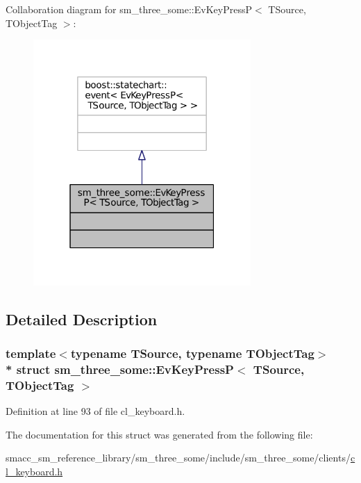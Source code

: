 Collaboration diagram for sm\+\_\+three\+\_\+some\+:\+:Ev\+Key\+PressP$<$ T\+Source, T\+Object\+Tag $>$\+:
\nopagebreak
\begin{figure}[H]
\begin{center}
\leavevmode
\includegraphics[width=235pt]{structsm__three__some_1_1EvKeyPressP__coll__graph}
\end{center}
\end{figure}


\subsection{Detailed Description}
\subsubsection*{template$<$typename T\+Source, typename T\+Object\+Tag$>$\\*
struct sm\+\_\+three\+\_\+some\+::\+Ev\+Key\+Press\+P$<$ T\+Source, T\+Object\+Tag $>$}



Definition at line 93 of file cl\+\_\+keyboard.\+h.



The documentation for this struct was generated from the following file\+:\begin{DoxyCompactItemize}
\item 
smacc\+\_\+sm\+\_\+reference\+\_\+library/sm\+\_\+three\+\_\+some/include/sm\+\_\+three\+\_\+some/clients/\hyperlink{cl__keyboard_8h}{cl\+\_\+keyboard.\+h}\end{DoxyCompactItemize}

